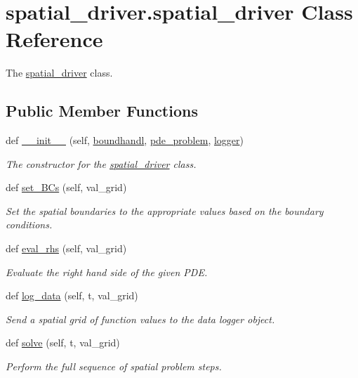 \hypertarget{classspatial__driver_1_1spatial__driver}{}\section{spatial\+\_\+driver.\+spatial\+\_\+driver Class Reference}
\label{classspatial__driver_1_1spatial__driver}


The \hyperlink{classspatial__driver_1_1spatial__driver}{spatial\+\_\+driver} class.  


\subsection*{Public Member Functions}
\begin{DoxyCompactItemize}
\item 
def \hyperlink{classspatial__driver_1_1spatial__driver_a6574f876678eb408a66e7a64422a8a65}{\+\_\+\+\_\+init\+\_\+\+\_\+} (self, \hyperlink{classspatial__driver_1_1spatial__driver_aeb66b87c7c18067c8a9a16b47bcbbd2f}{boundhandl}, \hyperlink{classspatial__driver_1_1spatial__driver_a22bfac114fe305ab4089d9ce0e71c678}{pde\+\_\+problem}, \hyperlink{classspatial__driver_1_1spatial__driver_a5d9fcdf9d8185cb89fb1941038cfbbc8}{logger})
\begin{DoxyCompactList}\small\item\em The constructor for the \hyperlink{classspatial__driver_1_1spatial__driver}{spatial\+\_\+driver} class. \end{DoxyCompactList}\item 
def \hyperlink{classspatial__driver_1_1spatial__driver_a9e108d8aae84dbbfdbd522ef47e8f559}{set\+\_\+\+B\+Cs} (self, val\+\_\+grid)
\begin{DoxyCompactList}\small\item\em Set the spatial boundaries to the appropriate values based on the boundary conditions. \end{DoxyCompactList}\item 
def \hyperlink{classspatial__driver_1_1spatial__driver_a21d6d94bbf287b9aeaf44c0ac4277635}{eval\+\_\+rhs} (self, val\+\_\+grid)
\begin{DoxyCompactList}\small\item\em Evaluate the right hand side of the given P\+DE. \end{DoxyCompactList}\item 
def \hyperlink{classspatial__driver_1_1spatial__driver_a2f07b13c98f23f86409eea8f66a90fa0}{log\+\_\+data} (self, t, val\+\_\+grid)
\begin{DoxyCompactList}\small\item\em Send a spatial grid of function values to the data logger object. \end{DoxyCompactList}\item 
def \hyperlink{classspatial__driver_1_1spatial__driver_a379238cfd02adf2ae124015e1108182d}{solve} (self, t, val\+\_\+grid)
\begin{DoxyCompactList}\small\item\em Perform the full sequence of spatial problem steps. \end{DoxyCompactList}\end{DoxyCompactItemize}
